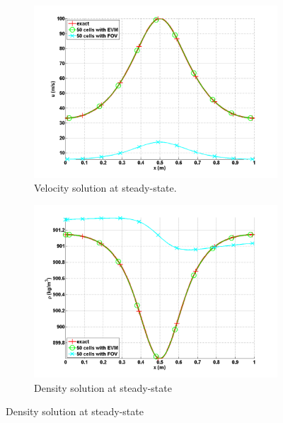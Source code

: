 \documentclass[preprint,10pt]{elsarticle}
\begin{document}
\begin{figure}[H]
        \centering
        \begin{subfigure}[b]{0.495\textwidth}
                \centering
                \includegraphics[width=\textwidth]{liquid_velocity_numerical_and_exact_50.png}
                \caption{Velocity solution at steady-state.}
                \label{fig:1d_nozzle_liq_vel}
        \end{subfigure}%
        \begin{subfigure}[b]{0.495\textwidth}
                \centering
                \includegraphics[width=\textwidth]{liquid_density_numerical_and_exact_50.png}
                \caption{Density solution at steady-state}

\end{subfigure}
\end{figure}
\end{document}
